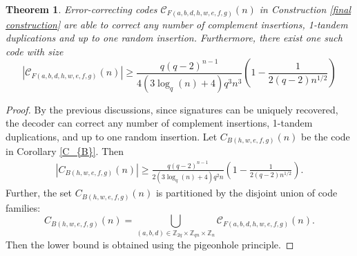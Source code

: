 \documentclass[pdflatex,sn-mathphys-num]{sn-jnl}
\theoremstyle{theorem}%
\newtheorem{theorem}{Theorem}
\theoremstyle{definition}
\theoremstyle{construction}
\newtheorem{open problem}{Open problem}
\begin{document}
\begin{theorem}\label{main thm}
Error-correcting codes $\mathcal{C}_{F(a,b,d,h,w,e,f,g)}(n)$ in Construction \ref{final construction} are able to correct any number of complement insertions, 1-tandem duplications and up to one random insertion. Furthermore, there exist one such code with size 
\begin{equation}
\left | \mathcal{C}_{F(a,b,d,h,w,e,f,g)}(n) \right | \ge  \frac{q(q-2)^{n-1}}{4\left(3\log_{q}(n)+4\right)q^{3}n^{3}} \left(1-\frac{1}{2(q-2)n^{1/2}}\right)
\end{equation}
\end{theorem}
\begin{proof}
By the previous discussions, since signatures can be uniquely recovered, the decoder can correct any number of complement insertions, 1-tandem duplications, and up to one random insertion. Let $C_{B(h,w,e,f,g)}(n)$ be the code in Corollary \ref{C_{B}}. Then 
\begin{align}
	\left |C_{B\left(h,w,e,f,g\right)}(n) \right | \ge \frac{q(q-2)^{n-1}}{2\left(3\log_{q}(n)+4\right)q^{2}n}\left(1-\frac{1}{2(q-2)n^{1/2}}\right).
\end{align}
Further, the set $C_{B(h,w,e,f,g)}(n)$ is partitioned by the disjoint union of code families:
	$$C_{B(h,w,e,f,g)}(n)=\bigcup_{(a,b,d)\in\mathbb{Z}_{2q}\times \mathbb{Z}_{qn}\times \mathbb{Z}_{n}}\mathcal{C}_{F(a,b,d,h,w,e,f,g)}(n).$$ Then the lower bound is obtained using the pigeonhole principle.
\end{proof}
\end{document}
